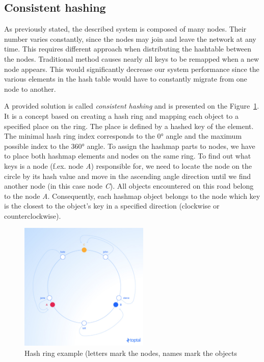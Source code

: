     \subsection{Consistent hashing}
        As previously stated, the described system is composed of many nodes. 
        Their number varies constantly, since the nodes may join and leave the network at any time.
        This requires different approach when distributing the hashtable between the nodes.
        Traditional method causes nearly all keys to be remapped when a new node appears.
        This would significantly decrease our system performance since the various elements in the hash table would have to constantly migrate from one node to another.
        
        A provided solution is called \textit{consistent hashing} and is presented on the Figure~\ref{ConsistentHashingImage1}.
        It is a concept based on creating a hash ring and mapping each object to a specified place on the ring. 
        The place is defined by a hashed key of the element.
        The minimal hash ring index corresponds to the \ang{0} angle and the maximum possible index to the \ang{360} angle.
        To assign the hashmap parts to nodes, we have to place both hashmap elements and nodes on the same ring.
        To find out what keys is a node (f.ex. node \textit{A}) responsible for, we need to locate the node on the circle by its hash value and move in the ascending angle direction until we find another node (in this case node \textit{C}). 
        All objects encountered on this road belong to the node \textit{A}.
        Consequently, each hashmap object belongs to the node which key is the closest to the object's key in a specified direction (clockwise or counterclockwise).
        
        \begin{figure}[ht]
            \centering
            \includegraphics[width=0.55\textwidth]{thesis/figures/hashring.png}  
            \caption{Hash ring example (letters mark the nodes, names mark the objects \cite{ConsistentHashing}}
            \label{ConsistentHashingImage1}
        \end{figure}
        
